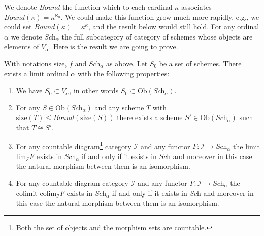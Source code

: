 \noindent
We denote $Bound$ the function which to each
cardinal $\kappa$ associates $Bound(\kappa) = \kappa^{\aleph_0}$.
We could make this function grow much more rapidly, e.g., we could
set $Bound(\kappa) = \kappa^\kappa$, and the result below would still hold.
For any ordinal $\alpha$ we denote $\textit{Sch}_\alpha$ the full
subcategory of category of schemes whose objects are elements of
$V_\alpha$. Here is the result we are going to prove.

\begin{lemma}
\label{lemma-construct-category}
With notations $\text{size}$, $f$ and $\textit{Sch}_\alpha$ as above.
Let $S_0$ be a set of schemes. There exists a limit ordinal
$\alpha$ with the following properties:
\begin{enumerate}
\item We have $S_0 \subset V_\alpha$, in other words
$S_0 \subset \text{Ob}(\textit{Sch}_\alpha)$.
\label{inclusion}
\item For any $S \in \text{Ob}(\textit{Sch}_\alpha)$ and any
scheme $T$ with $\text{size}(T) \leq Bound(\text{size}(S))$
there exists a scheme $S' \in \text{Ob}(\textit{Sch}_\alpha)$
such that $T \cong S'$.
\label{bounded}
\item For any countable diagram\footnote{Both the set of objects and
the morphism sets are countable.} category $\mathcal{I}$ and
any functor $F : \mathcal{I} \to \textit{Sch}_\alpha$ the limit
$\text{lim}_\mathcal{I} F$ exists in $\textit{Sch}_\alpha$ if and
only if it exists in $\textit{Sch}$ and moreover in this case
the natural morphism between them is an isomorphism.
\label{limit}
\item For any countable diagram category $\mathcal{I}$ and
any functor $F : \mathcal{I} \to \textit{Sch}_\alpha$ the colimit
$\text{colim}_\mathcal{I} F$ exists in $\textit{Sch}_\alpha$ if and
only if it exists in $\textit{Sch}$ and moreover in this case
the natural morphism between them is an isomorphism.
\label{colimit}
\end{enumerate}
\end{lemma}

